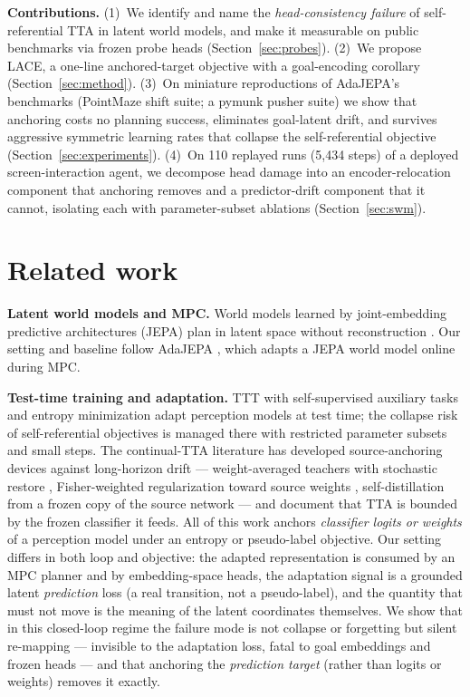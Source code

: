\documentclass{article}
\newcommand{\lace}{\textsc{LACE}}
\begin{document}
\textbf{Contributions.}
(1)~We identify and name the \emph{head-consistency failure} of
self-referential TTA in latent world models, and make it measurable on public
benchmarks via frozen probe heads (Section~\ref{sec:probes}).
(2)~We propose \lace{}, a one-line anchored-target objective with a
goal-encoding corollary (Section~\ref{sec:method}).
(3)~On miniature reproductions of AdaJEPA's benchmarks (PointMaze shift
suite; a pymunk pusher suite) we show that anchoring costs no planning
success, eliminates goal-latent drift, and survives aggressive symmetric
learning rates that collapse the self-referential objective
(Section~\ref{sec:experiments}).
(4)~On 110 replayed runs (5{,}434 steps) of a deployed screen-interaction
agent, we decompose head damage into an encoder-relocation component that
anchoring removes and a predictor-drift component that it cannot, isolating
each with parameter-subset ablations (Section~\ref{sec:swm}).

\section{Related work}
\label{sec:related}

\textbf{Latent world models and MPC.} World models learned by joint-embedding
predictive architectures (JEPA) \citep{lecun2022path,assran2023ijepa} plan in
latent space without reconstruction \citep{hansen2022tdmpc,zhou2024dinowm}.
Our setting and baseline follow AdaJEPA \citep{anonymous2026adajepa}, which
adapts a JEPA world model online during MPC.

\textbf{Test-time training and adaptation.} TTT with self-supervised
auxiliary tasks \citep{sun2020ttt,gandelsman2022ttt_mae} and entropy
minimization \citep{wang2021tent} adapt perception models at test time; the
collapse risk of self-referential objectives is managed there with restricted
parameter subsets and small steps. The continual-TTA literature has developed
source-anchoring devices against long-horizon drift --- weight-averaged
teachers with stochastic restore \citep{wang2022cotta}, Fisher-weighted
regularization toward source weights \citep{niu2022eata}, self-distillation
from a frozen copy of the source network \citep{song2023ecotta,sata2023} ---
and \citet{zhao2023pitfalls} document that TTA is bounded by the frozen
classifier it feeds. All of this work anchors \emph{classifier logits or
weights} of a perception model under an entropy or pseudo-label objective.
Our setting differs in both loop and objective: the adapted representation
is consumed by an MPC planner and by embedding-space heads, the adaptation
signal is a grounded latent \emph{prediction} loss (a real transition, not a
pseudo-label), and the quantity that must not move is the meaning of the
latent coordinates themselves. We show that in this closed-loop regime the
failure mode is not collapse or forgetting but silent re-mapping ---
invisible to the adaptation loss, fatal to goal embeddings and frozen heads
--- and that anchoring the \emph{prediction target} (rather than logits or
weights) removes it exactly.
\end{document}
